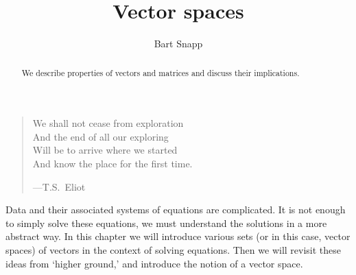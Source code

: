 \documentclass{ximera}
\author{Bart Snapp}
\title{Vector spaces}
\begin{document}
\begin{abstract}
  We describe properties of vectors and matrices and discuss their
  implications.
\end{abstract}
\maketitle

\begin{quote}
  We shall not cease from exploration\\
  And the end of all our exploring\\
  Will be to arrive where we started\\
  And know the place for the first time.


  \hfill ---T.S.\ Eliot
\end{quote}


Data and their associated systems of equations are complicated. It is
not enough to simply solve these equations, we must understand the
solutions in a more abstract way. In this chapter we will introduce
various sets (or in this case, vector spaces) of vectors in the
context of solving equations. Then we will revisit these ideas from
`higher ground,' and introduce the notion of a vector space.
\end{document}
